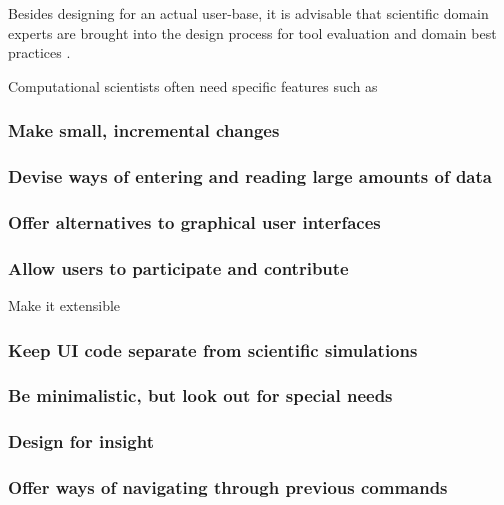 Besides designing for an actual user-base, it is advisable that scientific domain experts are brought into the design process for tool evaluation \cite{ Keefe:2010} and domain best practices \cite{Schraefel:2004,  DeMatos:2013}.

Computational scientists often need specific features such as  

\subsubsection{Make small, incremental changes}

\subsubsection{Devise ways of entering and reading large amounts of data}

\subsubsection{Offer alternatives to graphical user interfaces}

\subsubsection{Allow users to participate and contribute} Make it extensible

\subsubsection{Keep UI code separate from scientific simulations}

\subsubsection{Be minimalistic, but look out for special needs}

\subsubsection{Design for insight}

\subsubsection{Offer ways of navigating through previous commands}

